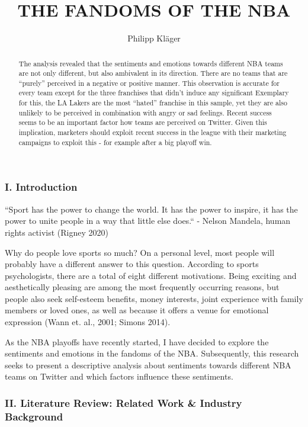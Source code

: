 \documentclass[
]{article}
\title{THE FANDOMS OF THE NBA}
\author{Philipp Kläger}
\date{}
\begin{document}
\maketitle
\begin{abstract}
The analysis revealed that the sentiments and emotions towards different
NBA teams are not only different, but also ambivalent in its direction.
There are no teams that are ``purely'' perceived in a negative or
positive manner. This observation is accurate for every team except for
the three franchises that didn't induce any significant Exemplary for
this, the LA Lakers are the most ``hated'' franchise in this sample, yet
they are also unlikely to be perceived in combination with angry or sad
feelings. Recent success seems to be an important factor how teams are
perceived on Twitter. Given this implication, marketers should exploit
recent success in the league with their marketing campaigns to exploit
this - for example after a big playoff win.
\end{abstract}

\hypertarget{i.-introduction}{%
\subsubsection{I. Introduction}\label{i.-introduction}}

``Sport has the power to change the world. It has the power to inspire,
it has the power to unite people in a way that little else does.`` -
Nelson Mandela, human rights activist (Rigney 2020)

Why do people love sports so much? On a personal level, most people will
probably have a different answer to this question. According to sports
psychologists, there are a total of eight different motivations. Being
exciting and aesthetically pleasing are among the most frequently
occurring reasons, but people also seek self-esteem benefits, money
interests, joint experience with family members or loved ones, as well
as because it offers a venue for emotional expression (Wann et. al.,
2001; Simons 2014).

As the NBA playoffs have recently started, I have decided to explore the
sentiments and emotions in the fandoms of the NBA. Subsequently, this
research seeks to present a descriptive analysis about sentiments
towards different NBA teams on Twitter and which factors influence these
sentiments.

\hfill\break

\hypertarget{ii.-literature-review-related-work-industry-background}{%
\subsubsection{II. Literature Review: Related Work \& Industry
Background}\label{ii.-literature-review-related-work-industry-background}}
\end{document}
